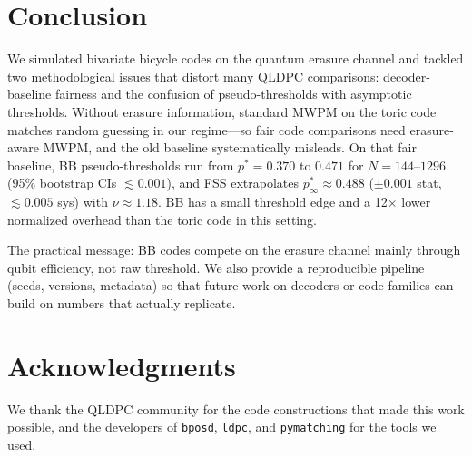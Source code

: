 \documentclass[twocolumn,10pt]{article}
\begin{document}
\section{Conclusion}

We simulated bivariate bicycle codes on the quantum erasure channel and tackled two
methodological issues that distort many QLDPC comparisons: decoder-baseline fairness and
the confusion of pseudo-thresholds with asymptotic thresholds.
Without erasure information, standard MWPM on the toric code matches random guessing in
our regime---so fair code comparisons need erasure-aware MWPM, and the old baseline
systematically misleads.
On that fair baseline, BB pseudo-thresholds run from $p^* = 0.370$ to $0.471$ for
$N = 144$--$1296$ (95\% bootstrap CIs $\lesssim 0.001$), and FSS extrapolates
$p^*_\infty \approx 0.488$ ($\pm 0.001$ stat, $\lesssim 0.005$ sys) with $\nu \approx 1.18$.
BB has a small threshold edge and a 12$\times$ lower normalized overhead than the toric
code in this setting.

The practical message: BB codes compete on the erasure channel mainly through qubit
efficiency, not raw threshold.
We also provide a reproducible pipeline (seeds, versions, metadata) so that future work on
decoders or code families can build on numbers that actually replicate.

\section*{Acknowledgments}

We thank the QLDPC community for the code constructions that made this work possible, and the
developers of \texttt{bposd}, \texttt{ldpc}, and \texttt{pymatching} for the tools we used.
\end{document}
